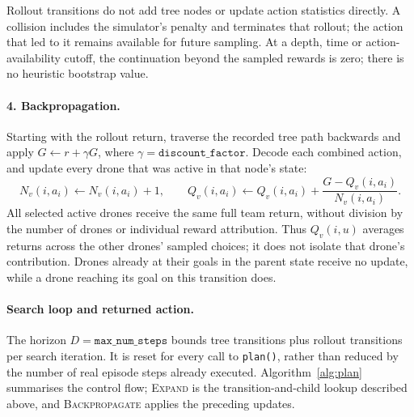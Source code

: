 \documentclass[11pt,a4paper]{article}
\begin{document}
Rollout transitions do not add tree nodes or update action statistics directly. A collision includes the simulator's penalty and terminates that rollout; the action that led to it remains available for future sampling. At a depth, time or action-availability cutoff, the continuation beyond the sampled rewards is zero; there is no heuristic bootstrap value.

\paragraph{4. Backpropagation.}
Starting with the rollout return, traverse the recorded tree path backwards and apply $G\leftarrow r+\gamma G$, where $\gamma=\texttt{discount\_factor}$. Decode each combined action, and update every drone that was active in that node's state:
\[
 N_v(i,a_i)\leftarrow N_v(i,a_i)+1,\qquad
 Q_v(i,a_i)\leftarrow Q_v(i,a_i)+\frac{G-Q_v(i,a_i)}{N_v(i,a_i)}.
\]
All selected active drones receive the same full team return, without division by the number of drones or individual reward attribution. Thus $Q_v(i,u)$ averages returns across the other drones' sampled choices; it does not isolate that drone's contribution. Drones already at their goals in the parent state receive no update, while a drone reaching its goal on this transition does.

\paragraph{Search loop and returned action.}
The horizon $D=\texttt{max\_num\_steps}$ bounds tree transitions plus rollout transitions per search iteration. It is reset for every call to \texttt{plan()}, rather than reduced by the number of real episode steps already executed. Algorithm~\ref{alg:plan} summarises the control flow; \textsc{Expand} is the transition-and-child lookup described above, and \textsc{Backpropagate} applies the preceding updates.
\end{document}
